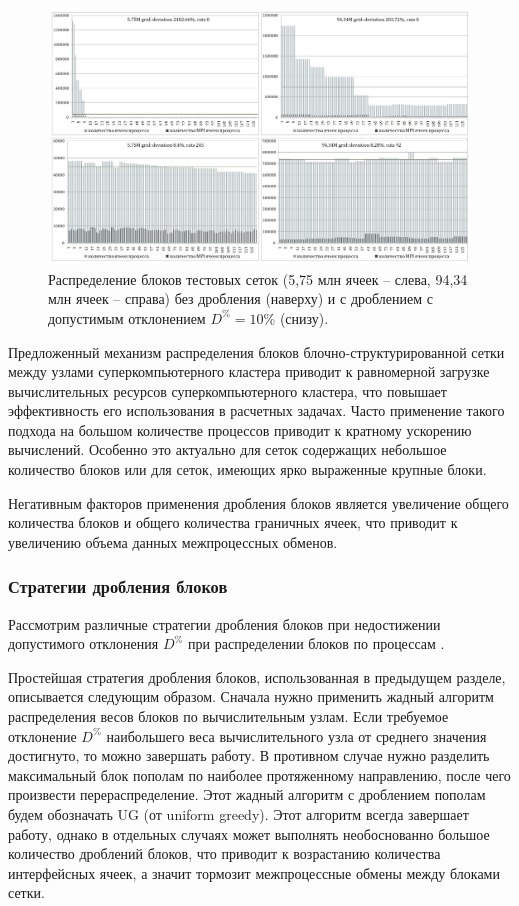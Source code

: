 \begin{figure}[ht]
\centering
\includegraphics[width=1.0\textwidth]{./pics/text_2_withcut/withcut-charts.pdf}
\singlespacing
{}\caption{Распределение блоков тестовых сеток (5,75 млн ячеек -- слева, 94,34 млн ячеек -- справа) без дробления (наверху) и с дроблением с допустимым отклонением $D^{\%} = 10\%$ (снизу).}
\label{fig:text_2_withcut_charts}
\end{figure}

Предложенный механизм распределения блоков блочно-структурированной сетки между узлами суперкомпьютерного кластера приводит к равномерной загрузке вычислительных ресурсов суперкомпьютерного кластера, что повышает эффективность его использования в расчетных задачах.
Часто применение такого подхода на большом количестве процессов приводит к кратному ускорению вычислений.
Особенно это актуально для сеток содержащих небольшое количество блоков или для сеток, имеющих ярко выраженные крупные блоки.

Негативным факторов применения дробления блоков является увеличение общего количества блоков и общего количества граничных ячеек, что приводит к увеличению объема данных межпроцессных обменов.

\subsubsection{Стратегии дробления блоков}

Рассмотрим различные стратегии дробления блоков при недостижении допустимого отклонения $D^{\%}$ при распределении блоков по процессам \cite{Bendersky2017Eff,Bendersky2018Block}.

Простейшая стратегия дробления блоков, использованная в предыдущем разделе, описывается следующим образом.
Сначала нужно применить жадный алгоритм распределения весов блоков по вычислительным узлам.
Если требуемое отклонение $D^{\%}$ наибольшего веса вычислительного узла от среднего значения достигнуто, то можно завершать работу.
В противном случае нужно разделить максимальный блок пополам по наиболее протяженному направлению, после чего произвести перераспределение.
Этот жадный алгоритм с дроблением пополам будем обозначать UG (от uniform greedy)\label{abbr:ug}.
Этот алгоритм всегда завершает работу, однако в отдельных случаях может выполнять необоснованно большое количество дроблений блоков, что приводит к возрастанию количества интерфейсных ячеек, а значит тормозит межпроцессные обмены между блоками сетки.

